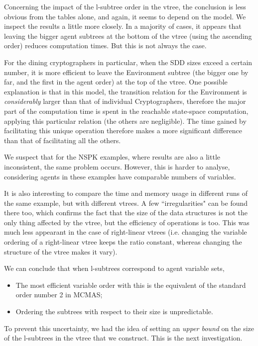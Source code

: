 \documentclass[11pt]{report}
\begin{document}
Concerning the impact of the l-subtree order in the vtree, the conclusion is less obvious from the tables alone, and again, it seems to depend on the model. We inspect the results a little more closely. In a majority of cases, it appears that leaving the bigger agent subtrees at the bottom of the vtree (using the ascending order) reduces computation times. But this is not always the case.

For the dining cryptographers in particular, when the SDD sizes exceed a certain number, it is more efficient to leave the Environment subtree (the bigger one by far, and the first in the agent order) at the top of the vtree. One possible explanation is that in this model, the transition relation for the Environment is \textit{considerably} larger than that of individual Cryptographers, therefore the major part of the computation time is spent in the reachable state-space computation, applying this particular relation (the others are negligible). The time gained by facilitating this unique operation therefore makes a more significant difference than that of facilitating all the others. 

We suspect that for the NSPK examples, where results are also a little inconsistent, the same problem occurs. However, this is harder to analyse, considering agents in these examples have comparable numbers of variables. 

It is also interesting to compare the time and memory usage in different runs of the same example, but with different vtrees. A few ``irregularities" can be found there too, which confirms the fact that the size of the data structures is not the only thing affected by the vtree, but the efficiency of operations is too. 
This was much less appearant in the case of right-linear vtrees (i.e. changing the variable ordering of a right-linear vtree keeps the ratio constant, whereas changing the structure of the vtree makes it vary). 

We can conclude that when l-subtrees correspond to agent variable sets,\begin{itemize}
\item The most efficient variable order with this is the equivalent of the standard order number 2 in MCMAS;
\item Ordering the subtrees with respect to their size is unpredictable.
\end{itemize}
To prevent this uncertainty, we had the idea of setting an \textit{upper bound} on the size of the l-subtrees in the vtree that we construct. This is the next investigation.
\end{document}
